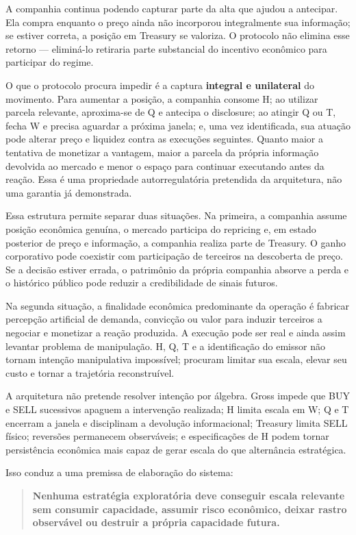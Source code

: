 \documentclass[
  a4paper,
]{article}
\begin{document}
A companhia continua podendo capturar parte da alta que ajudou a
antecipar. Ela compra enquanto o preço ainda não incorporou
integralmente sua informação; se estiver correta, a posição em Treasury
se valoriza. O protocolo não elimina esse retorno --- eliminá-lo
retiraria parte substancial do incentivo econômico para participar do
regime.

O que o protocolo procura impedir é a captura \textbf{integral e
unilateral} do movimento. Para aumentar a posição, a companhia consome
H; ao utilizar parcela relevante, aproxima-se de Q e antecipa o
disclosure; ao atingir Q ou T, fecha W e precisa aguardar a próxima
janela; e, uma vez identificada, sua atuação pode alterar preço e
liquidez contra as execuções seguintes. Quanto maior a tentativa de
monetizar a vantagem, maior a parcela da própria informação devolvida ao
mercado e menor o espaço para continuar executando antes da reação. Essa
é uma propriedade autorregulatória pretendida da arquitetura, não uma
garantia já demonstrada.

Essa estrutura permite separar duas situações. Na primeira, a companhia
assume posição econômica genuína, o mercado participa do repricing e, em
estado posterior de preço e informação, a companhia realiza parte de
Treasury. O ganho corporativo pode coexistir com participação de
terceiros na descoberta de preço. Se a decisão estiver errada, o
patrimônio da própria companhia absorve a perda e o histórico público
pode reduzir a credibilidade de sinais futuros.

Na segunda situação, a finalidade econômica predominante da operação é
fabricar percepção artificial de demanda, convicção ou valor para
induzir terceiros a negociar e monetizar a reação produzida. A execução
pode ser real e ainda assim levantar problema de manipulação. H, Q, T e
a identificação do emissor não tornam intenção manipulativa impossível;
procuram limitar sua escala, elevar seu custo e tornar a trajetória
reconstruível.

A arquitetura não pretende resolver intenção por álgebra. Gross impede
que BUY e SELL sucessivos apaguem a intervenção realizada; H limita
escala em W; Q e T encerram a janela e disciplinam a devolução
informacional; Treasury limita SELL físico; reversões permanecem
observáveis; e especificações de H podem tornar persistência econômica
mais capaz de gerar escala do que alternância estratégica.

Isso conduz a uma premissa de elaboração do sistema:

\begin{quote}
\textbf{Nenhuma estratégia exploratória deve conseguir escala relevante
sem consumir capacidade, assumir risco econômico, deixar rastro
observável ou destruir a própria capacidade futura.}
\end{quote}
\end{document}
